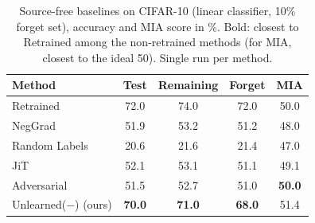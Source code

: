 \begin{table}[t]
  \centering
  \small
  \setlength{\tabcolsep}{4pt}
  \begin{tabular}{@{}lcccc@{}}
    \toprule
    Method & Test & Remaining & Forget & MIA \\
    \midrule
    Retrained & 72.0 & 74.0 & 72.0 & 50.0 \\
    \midrule
    NegGrad & 51.9 & 53.2 & 51.2 & 48.0 \\
    Random Labels & 20.6 & 21.6 & 21.4 & 47.0 \\
    JiT & 52.1 & 53.1 & 51.1 & 49.1 \\
    Adversarial & 51.5 & 52.7 & 51.0 & \textbf{50.0} \\
    Unlearned($-$) (ours) & \textbf{70.0} & \textbf{71.0} & \textbf{68.0} & 51.4 \\
    \bottomrule
  \end{tabular}
  \caption{Source-free baselines on CIFAR-10 (linear classifier, 10\% forget set), accuracy and MIA score in \%. Bold: closest to Retrained among the non-retrained methods (for MIA, closest to the ideal 50). Single run per method.}
  \label{tab:baselines}
\end{table}
